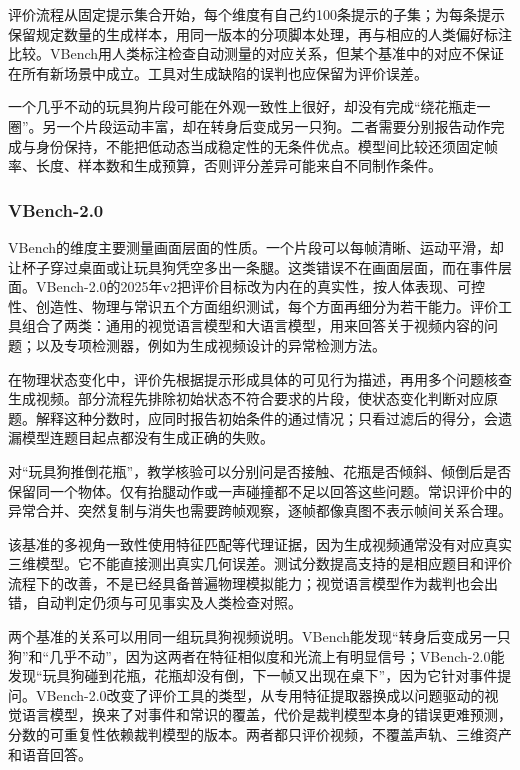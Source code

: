 评价流程从固定提示集合开始，每个维度有自己约100条提示的子集；为每条提示保留规定数量的生成样本，用同一版本的分项脚本处理，再与相应的人类偏好标注比较。VBench用人类标注检查自动测量的对应关系，但某个基准中的对应不保证在所有新场景中成立。工具对生成缺陷的误判也应保留为评价误差。

一个几乎不动的玩具狗片段可能在外观一致性上很好，却没有完成“绕花瓶走一圈”。另一个片段运动丰富，却在转身后变成另一只狗。二者需要分别报告动作完成与身份保持，不能把低动态当成稳定性的无条件优点。模型间比较还须固定帧率、长度、样本数和生成预算，否则评分差异可能来自不同制作条件。

\Needspace{65mm}
\subsubsection{VBench-2.0}
\label{sec:vision-generation-physics-check}
\label{sec:vision-multigen-vbench2}

VBench的维度主要测量画面层面的性质。一个片段可以每帧清晰、运动平滑，却让杯子穿过桌面或让玩具狗凭空多出一条腿。这类错误不在画面层面，而在事件层面。VBench-2.0的2025年v2把评价目标改为内在的真实性，按人体表现、可控性、创造性、物理与常识五个方面组织测试，每个方面再细分为若干能力。评价工具组合了两类：通用的视觉语言模型和大语言模型，用来回答关于视频内容的问题；以及专项检测器，例如为生成视频设计的异常检测方法。

在物理状态变化中，评价先根据提示形成具体的可见行为描述，再用多个问题核查生成视频。部分流程先排除初始状态不符合要求的片段，使状态变化判断对应原题。解释这种分数时，应同时报告初始条件的通过情况；只看过滤后的得分，会遗漏模型连题目起点都没有生成正确的失败。

对“玩具狗推倒花瓶”，教学核验可以分别问是否接触、花瓶是否倾斜、倾倒后是否保留同一个物体。仅有抬腿动作或一声碰撞都不足以回答这些问题。常识评价中的异常合并、突然复制与消失也需要跨帧观察，逐帧都像真图不表示帧间关系合理。

该基准的多视角一致性使用特征匹配等代理证据，因为生成视频通常没有对应真实三维模型。它不能直接测出真实几何误差。测试分数提高支持的是相应题目和评价流程下的改善，不是已经具备普遍物理模拟能力；视觉语言模型作为裁判也会出错，自动判定仍须与可见事实及人类检查对照。

两个基准的关系可以用同一组玩具狗视频说明。VBench能发现“转身后变成另一只狗”和“几乎不动”，因为这两者在特征相似度和光流上有明显信号；VBench-2.0能发现“玩具狗碰到花瓶，花瓶却没有倒，下一帧又出现在桌下”，因为它针对事件提问。VBench-2.0改变了评价工具的类型，从专用特征提取器换成以问题驱动的视觉语言模型，换来了对事件和常识的覆盖，代价是裁判模型本身的错误更难预测，分数的可重复性依赖裁判模型的版本。两者都只评价视频，不覆盖声轨、三维资产和语音回答。

